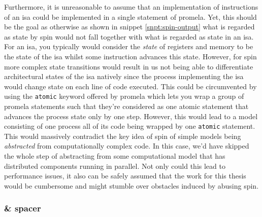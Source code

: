 Furthermore, it is unreasonable to assume that an implementation of instructions of an \gls{isa} could be implemented in a single statement of \gls{promela}.
Yet, this should be the goal as otherwise as shown in snippet \ref{snpt:spin-output} what is regarded as state by \gls{spin} would not fall together with what is regarded as state in an \gls{isa}.
For an \gls{isa}, you typically would consider the \textit{state} of registers and memory to be the state of the \gls{isa} whilst some instruction advances this state.
However, for \gls{spin} more complex state transitions would result in us not being able to differentiate architectural states of the \gls{isa} natively since the process implementing the \gls{isa} would change state on each line of code executed.
This could be circumvented by using the \lstinline{atomic} keyword offered by \gls{promela} which lets you wrap a group of \gls{promela} statements such that they're considered as one atomic statement that advances the process state only by one step.
However, this would lead to a model consisting of one process all of its code being wrapped by one \lstinline{atomic} statement.
This would massively contradict the key idea of \gls{spin} of simple models being \textit{abstracted} from computationally complex code.
In this case, we'd have skipped the whole step of abstracting from some computational model that has distributed components running in parallel.
Not only could this lead to performance issues, it also can be safely assumed that the work for this thesis would be cumbersome and might stumble over obstacles induced by abusing \gls{spin}.

\subsubsection{\muZ{} \& \gls{spacer}}
\label{sec:spacer}

